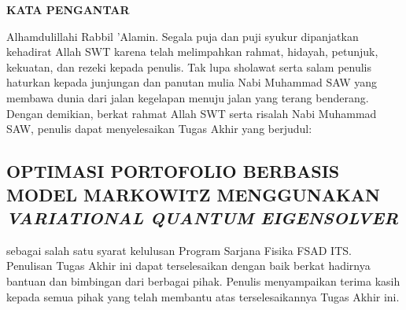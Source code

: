\begin{center}
	\large{\textbf{KATA PENGANTAR}}
\end{center}
\indent Alhamdulillahi Rabbil 'Alamin. Segala puja dan puji syukur dipanjatkan kehadirat Allah SWT karena telah melimpahkan rahmat, hidayah, petunjuk, kekuatan, dan rezeki kepada penulis. Tak lupa sholawat serta salam penulis haturkan kepada junjungan dan panutan mulia Nabi Muhammad SAW yang membawa dunia dari jalan kegelapan menuju jalan yang terang benderang. Dengan demikian, berkat rahmat Allah SWT serta risalah Nabi Muhammad SAW, penulis dapat menyelesaikan Tugas Akhir yang berjudul:
\begin{center}
	\section*{OPTIMASI PORTOFOLIO BERBASIS MODEL MARKOWITZ MENGGUNAKAN \textit{VARIATIONAL QUANTUM EIGENSOLVER}}
\end{center}
sebagai salah satu syarat kelulusan Program Sarjana Fisika FSAD ITS.\\
\indent Penulisan Tugas Akhir ini dapat terselesaikan dengan baik berkat hadirnya bantuan dan bimbingan dari berbagai pihak. Penulis menyampaikan terima kasih kepada semua pihak yang telah membantu atas terselesaikannya Tugas Akhir ini.
